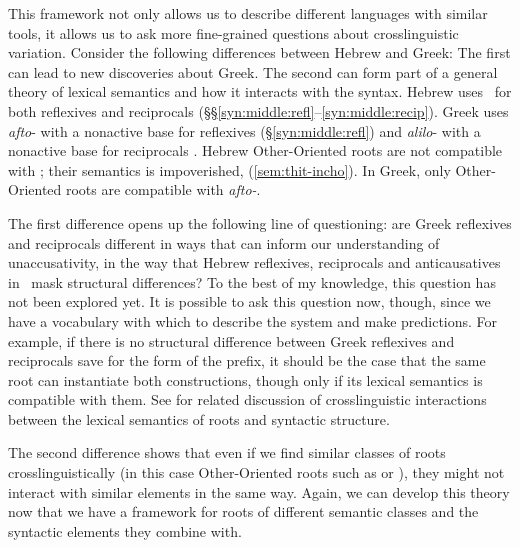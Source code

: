 This framework not only allows us to describe different languages with similar tools, it allows us to ask more fine-grained questions about crosslinguistic variation. Consider the following differences between Hebrew and Greek: The first can lead to new discoveries about Greek. The second can form part of a general theory of lexical semantics and how it interacts with the syntax.
\pex
	\a Hebrew uses \thit~for both reflexives and reciprocals (\S\S\ref{syn:middle:refl}--\ref{syn:middle:recip}). Greek uses \emph{afto}- with a nonactive base for reflexives (\S\ref{syn:middle:refl}) and \emph{alilo}- with a nonactive base for reciprocals \citep{alexiadouafto}.
	\a Hebrew Other-Oriented roots are not compatible with \va; their semantics is impoverished, (\ref{sem:thit-incho}). In Greek, only Other-Oriented roots are compatible with \emph{afto-}.
\xe

The first difference opens up the following line of questioning: are Greek reflexives and reciprocals different in ways that can inform our understanding of unaccusativity, in the way that Hebrew reflexives, reciprocals and anticausatives in \thit~mask structural differences? To the best of my knowledge, this question has not been explored yet. It is possible to ask this question now, though, since we have a vocabulary with which to describe the system and make predictions. For example, if there is no structural difference between Greek reflexives and reciprocals save for the form of the prefix, it should be the case that the same root can instantiate both constructions, though only if its lexical semantics is compatible with them. See \cite{alexiadouborerschaefer14} for related discussion of crosslinguistic interactions between the lexical semantics of roots and syntactic structure.

The second difference shows that even if we find similar classes of roots crosslinguistically (in this case Other-Oriented roots such as  or ), they might not interact with similar elements in the same way. Again, we can develop this theory now that we have a framework for roots of different semantic classes and the syntactic elements they combine with.



